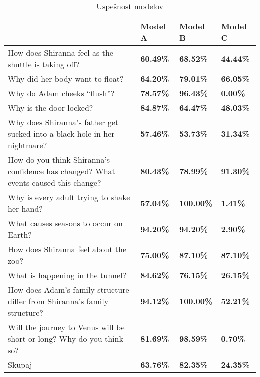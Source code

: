 \documentclass[journal]{IEEEtran}
\begin{document}
\begin{table}[]
	\begin{tabular}{l|l|l|l|}
		\cline{2-4}
		                            & Model A          & Model B          & Model C          \\ \hline
	
	
	\multicolumn{1}{|l|}{How does Shiranna feel as the shuttle is taking off?} & \textbf{60.49\%} & \textbf{68.52\%} & \textbf{44.44\%} \\ \hline
	\multicolumn{1}{|l|}{Why did her body want to float?} & \textbf{64.20\%} & \textbf{79.01\%} & \textbf{66.05\%} \\ \hline
	\multicolumn{1}{|l|}{Why do Adam cheeks “flush”?} & \textbf{78.57\%} & \textbf{96.43\%} & \textbf{0.00\%} \\ \hline
	\multicolumn{1}{|l|}{Why is the door locked?} & \textbf{84.87\%} & \textbf{64.47\%} & \textbf{48.03\%} \\ \hline
	\multicolumn{1}{|l|}{Why does Shiranna’s father get sucked into a black hole in her nightmare?} & \textbf{57.46\%} & \textbf{53.73\%} & \textbf{31.34\%} \\ \hline
	\multicolumn{1}{|l|}{How do you think Shiranna’s confidence has changed? What events caused this change?} & \textbf{80.43\%} & \textbf{78.99\%} & \textbf{91.30\%} \\ \hline
	\multicolumn{1}{|l|}{Why is every adult trying to shake her hand?} & \textbf{57.04\%} & \textbf{100.00\%} & \textbf{1.41\%} \\ \hline
	\multicolumn{1}{|l|}{What causes seasons to occur on Earth?} & \textbf{94.20\%} & \textbf{94.20\%} & \textbf{2.90\%} \\ \hline
	\multicolumn{1}{|l|}{How does Shiranna feel about the zoo?} & \textbf{75.00\%} & \textbf{87.10\%} & \textbf{87.10\%} \\ \hline
	\multicolumn{1}{|l|}{What is happening in the tunnel?} & \textbf{84.62\%} & \textbf{76.15\%} & \textbf{26.15\%} \\ \hline
	\multicolumn{1}{|l|}{How does Adam’s family structure differ from Shiranna’s family structure?} & \textbf{94.12\%} & \textbf{100.00\%} & \textbf{52.21\%} \\ \hline
	\multicolumn{1}{|l|}{Will the journey to Venus will be short or long? Why do you think so? } & \textbf{81.69\%} & \textbf{98.59\%} & \textbf{0.70\%} \\ \hline
	\multicolumn{1}{|l|}{Skupaj} & \textbf{63.76\%} & \textbf{82.35\%} & \textbf{24.35\%} \\ \hline
		
		
		
	\end{tabular}
	\caption{Uspešnost modelov}
	\label{t:mod}
\end{table}
\end{document}
